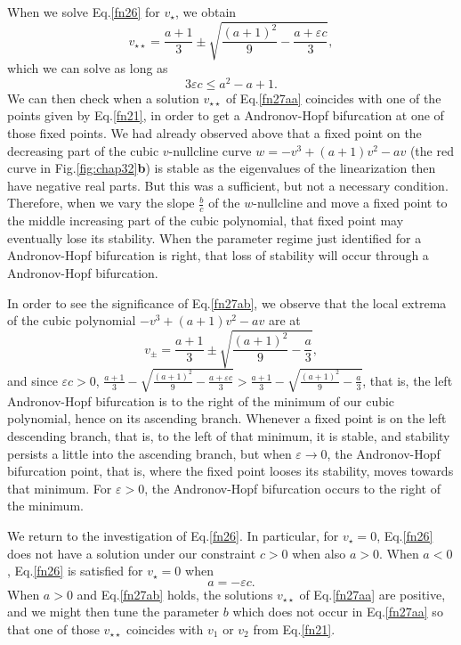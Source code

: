 When we solve Eq.\eqref{fn26} for $v_\star$, we obtain \begin{equation}\label{fn27aa}
v_{\star \star}=\frac{a+1}{3}\pm
\sqrt{\frac{(a+1)^2}{9}-\frac{a+\varepsilon c}{3}}, \end{equation} which we
can solve as long as \begin{equation}\label{fn27ab} 3\varepsilon c \le a^2-a +1. \end{equation}
We can then check when a solution $v_{\star \star}$ of
Eq.\eqref{fn27aa} coincides with one of the  points given by
Eq.\eqref{fn21}, in order to get a Andronov-Hopf bifurcation at one
of those  fixed points. We had already observed above that a fixed
point on the decreasing part of the cubic $v$-nullcline curve 
$w=-v^3+(a+1)v^2-av$ (the red curve in Fig.\ref{fig:chap32}\textbf{b})
is stable as the eigenvalues of the linearization then have
negative real parts. But this was a sufficient, but not a
necessary condition. Therefore, when we vary the slope
$\frac{b}{c}$ of the $w$-nullcline and move a fixed point to the middle increasing part
of the cubic polynomial, that fixed point may eventually lose its stability.
When the  parameter regime just identified for a Andronov-Hopf
bifurcation is right, that loss of stability will occur through a
Andronov-Hopf bifurcation.

In order to see the significance of Eq.\eqref{fn27ab}, we observe
that the local extrema of the cubic polynomial  $-v^3+(a+1)v^2-av$
are at \begin{equation}\label{rf27ac} v_\pm =\frac{a+1}{3}\pm
\sqrt{\frac{(a+1)^2}{9}-\frac{a}{3}}, \end{equation} and since $\varepsilon c
>0$, $\frac{a+1}{3}- \sqrt{\frac{(a+1)^2}{9}-\frac{a+\varepsilon
c}{3}}> \frac{a+1}{3}- \sqrt{\frac{(a+1)^2}{9}-\frac{a}{3}}$, that
is, the left Andronov-Hopf bifurcation is to the right of the
minimum of our cubic polynomial, hence on its ascending branch.
Whenever a fixed point is on the left descending branch, that is,
to the left of that minimum, it is stable, and stability persists
a little into the ascending branch, but when $\varepsilon \to 0$,
the Andronov-Hopf bifurcation point, that is, where the fixed point
looses its stability, moves towards that minimum. For $\varepsilon
>0$, the Andronov-Hopf bifurcation occurs to the right of the
minimum.

We return to the investigation of Eq.\eqref{fn26}. In particular, for
$v_\star =0$, Eq.\eqref{fn26} does not have a solution under our
constraint $ c>0$ when also $a>0$. When $a<0$, Eq.\eqref{fn26} is
satisfied for $v_\star =0$ when \begin{equation}\label{fn27a} a=-\varepsilon c.\end{equation}
When $a>0$ and Eq.\eqref{fn27ab} holds, the solutions $v_{\star
\star}$ of Eq.\eqref{fn27aa} are positive, and we might then tune the
parameter $b$ which does not occur in Eq.\eqref{fn27aa} so that one
of those $v_{\star \star}$ coincides with $v_1$ or $v_2$ from
Eq.\eqref{fn21}.

